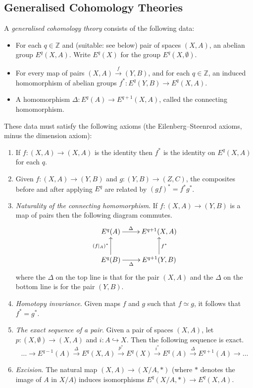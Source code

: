 \documentclass[a4paper,10pt]{article}
\theoremstyle{plain}%
\theoremstyle{definition}
\theoremstyle{remark}
\newcommand{\ZZ}{\mathbb{Z}}
\newcommand{\into}{\hookrightarrow}
\newcommand{\xto}[1]{\xrightarrow{#1}}
\begin{document}
\subsection{Generalised Cohomology Theories}

A \emph{generalised cohomology theory} consists of the following data:
\begin{itemize}
\item For each $q \in \ZZ$ and (suitable: see below) pair of spaces
  $(X,A)$, an abelian group $E^q(X,A)$. Write $E^q(X)$ for the group
  $E^q(X, \emptyset)$.

\item For every map of pairs $(X,A) \xto{f} (Y,B)$, and for each $q
  \in \ZZ$, an induced homomorphism of abelian groups $f^*: E^q(Y,B)
  \to E^q(X,A)$.

\item A homomorphism $\Delta: E^q(A) \to E^{q+1}(X,A)$, called the
  connecting homomorphism.
\end{itemize}
These data must satisfy the following axioms (the Eilenberg--Steenrod
axioms, minus the dimension axiom):
\begin{enumerate}
\item If $f: (X,A) \to (X,A)$ is the identity then $f^*$ is the
  identity on $E^q(X,A)$ for each $q$.

\item Given $f: (X,A)\to (Y,B)$ and $g: (Y,B)\to (Z,C)$, the
  composites before and after applying $E^q$ are related by $(gf)^* =
  f^*g^*$.

\item \emph{Naturality of the connecting homomorphism}. If $f:
  (X,A)\to (Y,B)$ is a map of pairs then the following diagram
  commutes.
  \begin{equation*}
    \xymatrix{
      E^q(A) \ar[r]^-\Delta & E^{q+1}(X,A)\\
      E^q(B) \ar[r]_-\Delta \ar[u]^{(f|_A)^*} & E^{q+1}(Y,B) \ar[u]_{f^*}
    }
  \end{equation*}
  where the $\Delta$ on the top line is that for the pair $(X,A)$ and
  the $\Delta$ on the bottom line is for the pair $(Y,B)$.

\item \emph{Homotopy invariance}. Given maps $f$ and $g$ such that $f
  \simeq g$, it follows that $f^* = g^*$.

\item \emph{The exact sequence of a pair}. Given a pair of spaces
  $(X,A)$, let $p: (X,\emptyset) \to (X,A)$ and $i: A \into X$. Then
  the following sequence is exact.
  \begin{equation*}
    \dots \to E^{q-1}(A) \xto{\Delta} E^q(X,A) \xto{p^*}
    E^q(X) \xto{i^*} E^q(A) \xto{\Delta} E^{q+1}(A) \to \dots
  \end{equation*}

\item \emph{Excision}. The natural map $(X,A) \to (X/A, *)$ (where $*$
  denotes the image of $A$ in $X/A$) induces isomorphisms $E^q(X/A,*)
  \to E^q(X,A)$.
\end{enumerate}
\end{document}
